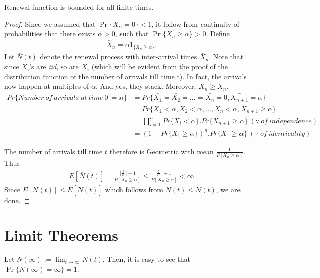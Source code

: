 \documentclass[a4paper,10pt, english]{article}
\begin{document}
\begin{prop} Renewal function is bounded for all finite times.
\end{prop}
\begin{proof}
	Since we assumed that $\Pr\{X_n = 0\} < 1$, it follow from continuity of probabilities that there exists $\alpha > 0$, such that $\Pr\{X_n \geq \alpha\} >0$. Define
	\begin{align*}
	\bar{X}_n = \alpha 1_{\{X_n \geq \alpha\}}.
	\end{align*}
	Let $\bar{N}(t)$ denote the renewal process with inter-arrival times $\bar{X}_n$. Note that since $X_i$'s are \emph{iid}, so are $\bar{X}_i$ (which will be evident from the proof of the distribution function of the number of arrivals till time t). In fact, the arrivals now happen at multiples of $\alpha$. And yes, they stack. Moreover, $X_n \geq \bar{X}_n$. \\
	
	\begin{align*}
	Pr\{Number ~of ~arrivals ~at ~time ~0 ~= n\} &= Pr\{\bar{X_1}=\bar{X_2}=\ldots=\bar{X_n}=0,\bar{X_{n+1}}=\alpha\} \\
	&= Pr\{X_1 < \alpha,X_2 < \alpha,\ldots,X_n < \alpha,X_{n+1} \geq \alpha\} \\
	&= \prod_{i=1}^{n} Pr\{X_i < \alpha\} . Pr\{X_{n+1} \geq \alpha \} ~(\because ~of ~independence) \\
	&= \left(1- Pr\{X_1 \geq \alpha \}\right) ^{n} . Pr\{X_1 \geq \alpha\}~(\because ~of ~identicality) 
	\end{align*}
	
	The number of arrivals till time $t$ therefore is Geometric with mean $\frac{1}{P[X_n \geq \alpha]}$. Thus 
	\begin{align*}
	E[\bar{N}(t)] = \frac{\lfloor\frac{t}{\alpha} \rceil + 1}{P[X_n \geq \alpha]} \leq \frac{\frac{t}{\alpha} \rceil + 1}{P[X_n \geq \alpha]} < \infty
	\end{align*}
	Since $E[N(t)] \leq E[\bar{N}(t)]$ which follows from $N(t) \leq \bar{N}(t)$, we are done.
\end{proof} 
\section{Limit Theorems}

\begin{lem}
	Let $N(\infty) := \lim_{t \to \infty} N(t)$. Then, it is easy to see that $\Pr\{N(\infty) = \infty\} = 1$.	
\end{lem}
\end{document}
